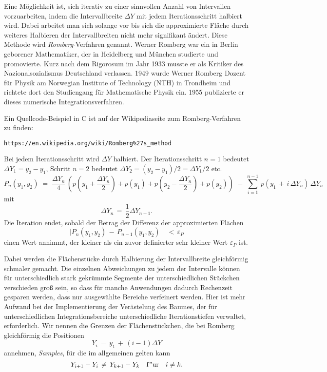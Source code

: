 Eine Möglichkeit ist, sich iterativ zu einer sinnvollen Anzahl von Intervallen
vorzuarbeiten, indem die Intervallbreite $\Delta Y$ mit jedem Iterationsschritt halbiert wird.
Dabei arbeitet man sich solange vor bis sich die approximierte Fläche
durch weiteres Halbieren der Intervallbreiten nicht mehr
signifikant ändert. Diese Methode wird \textsl{Romberg}-Verfahren genannt.
Werner Romberg war ein in Berlin geborener Mathematiker, der in Heidelberg und München
studierte und promovierte. Kurz nach dem Rigorosum im Jahr 1933 musste er als Kritiker
des Nazionalsozialismus Deutschland verlassen. 1949 wurde Werner Romberg Dozent für Physik
am Norwegian Institute of Technology (NTH) in Trondheim und richtete dort den Studiengang
für Mathematische Physik ein. 1955 publizierte er dieses numerische Integrationsverfahren.

Ein Quellcode-Beispiel in C ist auf der Wikipediaseite zum Romberg-Verfahren zu finden:
\begin{verbatim}
https://en.wikipedia.org/wiki/Romberg%27s_method
\end{verbatim}
Bei jedem Iterationsschritt wird $\Delta Y$ halbiert.
Der Iterationsschritt $n = 1$ bedeutet $\Delta Y_1 = y_2 - y_1$, Schritt $n = 2$
bedeutet $\Delta Y_2 = (y_2 - y_1)/2 = \Delta Y_1/2$ etc.
\begin{equation}
P_n (y_1, y_2) \; = \;
\frac{\Delta Y_n}{4} \, (p(y_1 + \frac{\Delta Y_n}{2}) + p(y_1) +
p(y_2 - \frac{\Delta Y_n}{2}) + p(y_2)) \; + \;
\sum\limits_{i=1}^{n-1} \,
p(y_1 \, + \, i \, \Delta Y_n) \, \Delta Y_n
\end{equation}
mit
$$
 \Delta Y_n \, = \, \frac{1}{2} \Delta Y_{n-1} .
$$
Die Iteration endet, sobald der Betrag der Differenz der approximierten Flächen
\begin{equation}
\mid P_n (y_1, y_2) \, - \, P_{n-1} (y_1, y_2) \mid \, < \, \varepsilon_P
\end{equation}
einen Wert annimmt, der kleiner als ein zuvor definierter sehr kleiner Wert $\varepsilon_P$ ist.

Dabei werden die Flächenstücke durch Halbierung der Intervallbreite gleichförmig schmaler gemacht.
Die einzelnen Abweichungen zu jedem der Intervalle können für unterschiedlich stark gekrümmte
Segmente der unterschiedlichen Stückchen verschieden groß sein, so dass für manche
Anwendungen dadurch Rechenzeit gesparen werden, dass nur ausgewählte Bereiche
verfeinert werden. Hier ist mehr Aufwand bei der Implementierung der Verästelung des Baumes,
der für unterschiedlichen Integrationsbereiche unterschiedliche Iterationstiefen verwaltet,
erforderlich. Wir nennen die Grenzen der Flächenstückchen, die bei Romberg gleichförmig die Positionen
$$
Y_i \, = \, y_1 \, + \, (i-1) \Delta Y
$$
annehmen, \textsl{Samples}, für die im allgemeinen gelten kann
\begin{equation}
Y_{i+1} - Y_i \, \neq \, Y_{k+1} - Y_k \quad \mathrm{f{"u}r} \quad i \neq k .
\end{equation}

